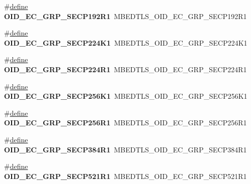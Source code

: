 \begin{DoxyCompactItemize}
\item 
\mbox{\label{compat-1_83_8h_a1179f8818222df1e0eae894d6d19847a}} 
\#\hyperlink{structdefine}{define} {\bfseries O\+I\+D\+\_\+\+E\+C\+\_\+\+G\+R\+P\+\_\+\+S\+E\+C\+P192\+R1}~M\+B\+E\+D\+T\+L\+S\+\_\+\+O\+I\+D\+\_\+\+E\+C\+\_\+\+G\+R\+P\+\_\+\+S\+E\+C\+P192\+R1
\item 
\mbox{\label{compat-1_83_8h_aa237bd08aeec1d39392858889afe4864}} 
\#\hyperlink{structdefine}{define} {\bfseries O\+I\+D\+\_\+\+E\+C\+\_\+\+G\+R\+P\+\_\+\+S\+E\+C\+P224\+K1}~M\+B\+E\+D\+T\+L\+S\+\_\+\+O\+I\+D\+\_\+\+E\+C\+\_\+\+G\+R\+P\+\_\+\+S\+E\+C\+P224\+K1
\item 
\mbox{\label{compat-1_83_8h_aee64f23de1a5800296cec2344cacf2ff}} 
\#\hyperlink{structdefine}{define} {\bfseries O\+I\+D\+\_\+\+E\+C\+\_\+\+G\+R\+P\+\_\+\+S\+E\+C\+P224\+R1}~M\+B\+E\+D\+T\+L\+S\+\_\+\+O\+I\+D\+\_\+\+E\+C\+\_\+\+G\+R\+P\+\_\+\+S\+E\+C\+P224\+R1
\item 
\mbox{\label{compat-1_83_8h_a3635a4e65088e78421aeae7bd4e63d7f}} 
\#\hyperlink{structdefine}{define} {\bfseries O\+I\+D\+\_\+\+E\+C\+\_\+\+G\+R\+P\+\_\+\+S\+E\+C\+P256\+K1}~M\+B\+E\+D\+T\+L\+S\+\_\+\+O\+I\+D\+\_\+\+E\+C\+\_\+\+G\+R\+P\+\_\+\+S\+E\+C\+P256\+K1
\item 
\mbox{\label{compat-1_83_8h_a88083d8105b275a95efa4d536e7ab930}} 
\#\hyperlink{structdefine}{define} {\bfseries O\+I\+D\+\_\+\+E\+C\+\_\+\+G\+R\+P\+\_\+\+S\+E\+C\+P256\+R1}~M\+B\+E\+D\+T\+L\+S\+\_\+\+O\+I\+D\+\_\+\+E\+C\+\_\+\+G\+R\+P\+\_\+\+S\+E\+C\+P256\+R1
\item 
\mbox{\label{compat-1_83_8h_ae99682dc4008c793b6aedb1053fc9178}} 
\#\hyperlink{structdefine}{define} {\bfseries O\+I\+D\+\_\+\+E\+C\+\_\+\+G\+R\+P\+\_\+\+S\+E\+C\+P384\+R1}~M\+B\+E\+D\+T\+L\+S\+\_\+\+O\+I\+D\+\_\+\+E\+C\+\_\+\+G\+R\+P\+\_\+\+S\+E\+C\+P384\+R1
\item 
\mbox{\label{compat-1_83_8h_a156c6ca3795576a9195383b373f4c63e}} 
\#\hyperlink{structdefine}{define} {\bfseries O\+I\+D\+\_\+\+E\+C\+\_\+\+G\+R\+P\+\_\+\+S\+E\+C\+P521\+R1}~M\+B\+E\+D\+T\+L\+S\+\_\+\+O\+I\+D\+\_\+\+E\+C\+\_\+\+G\+R\+P\+\_\+\+S\+E\+C\+P521\+R1
\item 

\end{DoxyCompactItemize}
